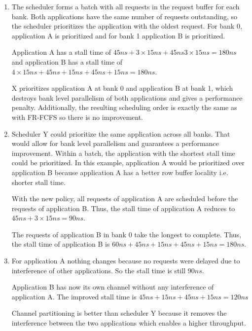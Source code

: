 \documentclass[a4paper]{article}
\begin{document}
\begin{enumerate}[label=\alph*)]
    \item The scheduler forms a batch with all requests in the request buffer
        for each bank. Both applications have the same number of requests
        outstanding, so the scheduler prioritizes the application with the
        oldest request. For bank 0, application A is prioritized and for bank
        1 application B is prioritized.

        Application A has a stall time of $45ns + 3 \times 15ns + 45ns 3 \times
        15ns = 180ns$ and application B has a stall time of $4 \times 15ns
        + 45ns + 15ns + 45ns + 15ns = 180ns$.

        X prioritizes application A at bank 0 and application B at bank 1,
        which destroys bank level parallelism of both applications and gives
        a performance penalty. Additionally, the resulting scheduling order is
        exactly the same as with FR-FCFS so there is no improvement.

    \item Scheduler Y could prioritize the same application across all banks.
        That would allow for bank level parallelism and guarantees a performance
        improvement. Within a batch, the application with the shortest stall
        time could be prioritized. In this example, application A would be
        prioritized over application B because application A has a better row
        buffer locality i.e. shorter stall time.

        With the new policy, all requests of application A are scheduled before
        the requests of application B. Thus, the stall time of application
        A reduces to $45ns + 3 \times 15ns = 90ns$.

        The requests of application B in bank 0 take the longest to complete.
        Thus, the stall time of application B is $60ns + 45ns + 15ns + 45ns
        + 15ns = 180ns$.

    \item For application A nothing changes because no requests were delayed
        due to interference of other applications. So the stall time is still
        $90 ns$.

        Application B has now its own channel without any interference of
        application A. The improved stall time is $45ns + 15ns + 45ns + 15ns
        = 120ns$

        Channel partitioning is better than scheduler Y because it removes the
        interference between the two applications which enables a higher
        throughput.
\end{enumerate}
\end{document}
